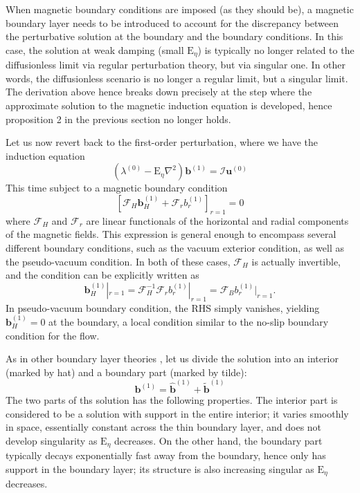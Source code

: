 When magnetic boundary conditions are imposed (as they should be), a magnetic boundary layer needs to be introduced to account for the discrepancy between the perturbative solution at the boundary and the boundary conditions. In this case, the solution at weak damping (small $\mathrm{E}_\eta$) is typically no longer related to the diffusionless limit via regular perturbation theory, but via singular one. In other words, the diffusionless scenario is no longer a regular limit, but a singular limit. The derivation above hence breaks down precisely at the step where the approximate solution to the magnetic induction equation is developed, hence {\todoremark proposition 2} in the previous section no longer holds.

Let us now revert back to the first-order perturbation, where we have the induction equation
%
\begin{equation}
    \left(\lambda^{(0)} - \mathrm{E}_\eta \nabla^2\right) \mathbf{b}^{(1)} = \mathcal{I} \mathbf{u}^{(0)}
\end{equation}
%
This time subject to a magnetic boundary condition 
%
\begin{equation}
    \left[\mathcal{F}_H \mathbf{b}^{(1)}_H + \mathcal{F}_r b_r^{(1)}\right]_{r=1} = 0
\end{equation}
%
where $\mathcal{F}_H$ and $\mathcal{F}_r$ are linear functionals of the horizontal and radial components of the magnetic fields. This expression is general enough to encompass several different boundary conditions, such as the vacuum exterior condition, as well as the pseudo-vacuum condition. In both of these cases, $\mathcal{F}_H$ is actually invertible, and the condition can be explicitly written as
%
\begin{equation}
    \mathbf{b}_H^{(1)}|_{r=1} = \mathcal{F}_H^{-1} \mathcal{F}_r b_r^{(1)}|_{r=1} = \mathcal{F}_B b_r^{(1)}|_{r=1}.
\end{equation}
%
In pseudo-vacuum boundary condition, the RHS simply vanishes, yielding $\mathbf{b}_H^{(1)} = 0$ at the boundary, a local condition similar to the no-slip boundary condition for the flow. 

As in other boundary layer theories \citep[][among others]{greenspan_theory_1968,kerswell_tidal_1994,zhang_theory_2017}, let us divide the solution into an interior (marked by hat) and a boundary part (marked by tilde):
%
\begin{equation}
    \mathbf{b}^{(1)} = \widehat{\mathbf{b}}^{(1)} + \widetilde{\mathbf{b}}^{(1)}
\end{equation}
%
The two parts of ths solution has the following properties. The interior part is considered to be a solution with support in the entire interior; it varies smoothly in space, essentially constant across the thin boundary layer, and does not develop singularity as $\mathrm{E}_\eta$ decreases. On the other hand, the boundary part typically decays exponentially fast away from the boundary, hence only has support in the boundary layer; its structure is also increasing singular as $\mathrm{E}_\eta$ decreases.

